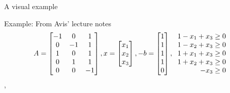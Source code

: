 \documentclass[10pt]{beamer}
\begin{document}
\begin{frame}{A visual example}
	
	\begin{exampleblock}{Example: From Avis' lecture notes}
		\begin{equation*}
			A = \begin{bmatrix}
			-1&0&1\\
			0&-1&1\\
			1&0&1\\
			0&1&1\\
			0&0&-1\\
			\end{bmatrix},
			x = \begin{bmatrix}
			x_1\\x_2\\x_3\\
			\end{bmatrix},
			-b = \begin{bmatrix}
			1\\1\\1\\1\\0\\
			\end{bmatrix},
			\begin{tabular}{r}
			$ 1-x_1+x_3\geq 0 $\\
			$ 1-x_2+x_3\geq 0 $\\
			$ 1+x_1+x_3\geq 0 $\\
			$ 1+x_2+x_3\geq 0 $\\
			$ -x_3 \geq 0 $\\
			\end{tabular}
		\end{equation*},
		
		
	\end{exampleblock}
\end{frame}
\end{document}
